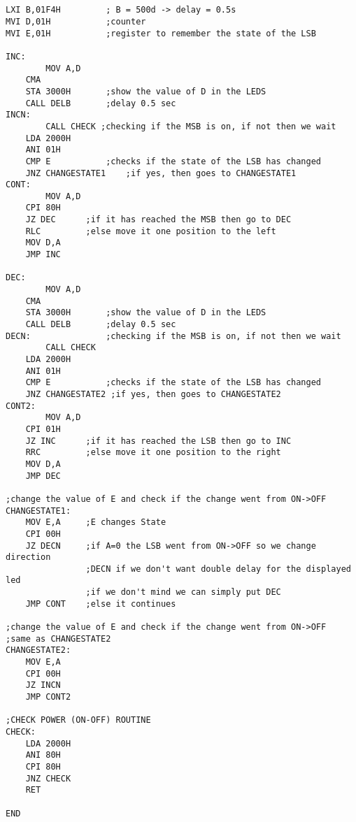 \documentclass[11pt]{article}
\begin{document}
\begin{verbatim}


LXI B,01F4H 	    ; B = 500d -> delay = 0.5s
MVI D,01H	        ;counter
MVI E,01H	        ;register to remember the state of the LSB 

INC:	
        MOV A,D
	CMA
	STA 3000H	    ;show the value of D in the LEDS
	CALL DELB	    ;delay 0.5 sec
INCN:
        CALL CHECK ;checking if the MSB is on, if not then we wait
	LDA 2000H
	ANI 01H
	CMP E		    ;checks if the state of the LSB has changed
	JNZ CHANGESTATE1    ;if yes, then goes to CHANGESTATE1
CONT:	
        MOV A,D
	CPI 80H
	JZ DEC		;if it has reached the MSB then go to DEC
	RLC		    ;else move it one position to the left
	MOV D,A
	JMP INC

DEC:	
        MOV A,D
	CMA
	STA 3000H	    ;show the value of D in the LEDS
	CALL DELB	    ;delay 0.5 sec
DECN:	        	;checking if the MSB is on, if not then we wait
        CALL CHECK
	LDA 2000H
	ANI 01H
	CMP E		    ;checks if the state of the LSB has changed
	JNZ CHANGESTATE2 ;if yes, then goes to CHANGESTATE2
CONT2:	
        MOV A,D
	CPI 01H
	JZ INC		;if it has reached the LSB then go to INC
	RRC		    ;else move it one position to the right
	MOV D,A
	JMP DEC

;change the value of E and check if the change went from ON->OFF 
CHANGESTATE1:	
	MOV E,A	    ;E changes State
	CPI 00H	
	JZ DECN	    ;if A=0 the LSB went from ON->OFF so we change direction
				;DECN if we don't want double delay for the displayed led
				;if we don't mind we can simply put DEC
	JMP CONT	;else it continues

;change the value of E and check if the change went from ON->OFF 
;same as CHANGESTATE2 
CHANGESTATE2:	
	MOV E,A
	CPI 00H
	JZ INCN
	JMP CONT2	

;CHECK POWER (ON-OFF) ROUTINE
CHECK:	
    LDA 2000H
	ANI 80H
	CPI 80H
	JNZ CHECK
	RET

END		

\end{verbatim}
\end{document}

